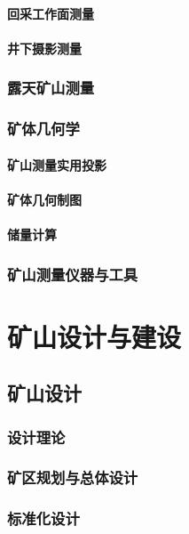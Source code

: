 \documentclass[UTF8]{../../ApplicationUniverse}
\begin{document}
        \subsubsection{回采工作面测量}
        \subsubsection{井下摄影测量}
    \subsection{露天矿山测量}
    \subsection{矿体几何学}
        \subsubsection{矿山测量实用投影}
        \subsubsection{矿体几何制图}
        \subsubsection{储量计算}
    \subsection{矿山测量仪器与工具}







\chapter{矿山设计与建设}
\section{矿山设计}
    \subsection{设计理论}
    \subsection{矿区规划与总体设计}
    \subsection{标准化设计}
\end{document}
